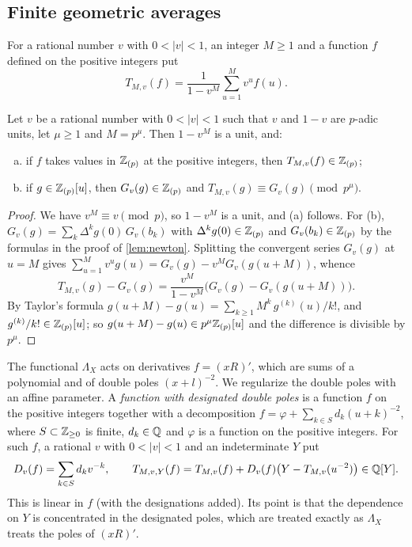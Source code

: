 \subsection{Finite geometric averages}\label{sec:finite-averages}
For a rational number $v$ with $0<|v|<1$, an integer $M\ge1$ and a function $f$ defined on the positive integers put
\[
T_{M,v}(f)=\frac1{1-v^M}\sum_{u=1}^Mv^uf(u).
\]

\begin{lemma}\label{lem:finite-moments}
Let $v$ be a rational number with $0<|v|<1$ such that $v$ and $1-v$ are $p$-adic units, let $\mu\ge1$ and $M=p^\mu$. Then $1-v^M$ is a unit, and:
\begin{enumerate}[(a)]
\item if $f$ takes values in $\mathbb{Z}_{(p)}$ at the positive integers, then $T_{M,v}(f)\in\mathbb{Z}_{(p)}$;
\item if $g\in\mathbb{Z}_{(p)}[u]$, then $G_v(g)\in\mathbb{Z}_{(p)}$ and $T_{M,v}(g)\equiv G_v(g)\pmod{p^\mu}$.
\end{enumerate}
\end{lemma}

\begin{proof}
We have $v^M\equiv v\pmod p$, so $1-v^M$ is a unit, and (a) follows. For (b), $G_v(g)=\sum_k\Delta^kg(0)\,G_v(b_k)$ with $\Delta^kg(0)\in\mathbb{Z}_{(p)}$ and $G_v(b_k)\in\mathbb{Z}_{(p)}$ by the formulas in the proof of \cref{lem:newton}. Splitting the convergent series $G_v(g)$ at $u=M$ gives $\sum_{u=1}^Mv^ug(u)=G_v(g)-v^MG_v(g(u+M))$, whence
\[
T_{M,v}(g)-G_v(g)=\frac{v^M}{1-v^M}\bigl(G_v(g)-G_v(g(u+M))\bigr).
\]
By Taylor's formula $g(u+M)-g(u)=\sum_{k\ge1}M^k\,g^{(k)}(u)/k!$, and $g^{(k)}/k!\in\mathbb{Z}_{(p)}[u]$; so $g(u+M)-g(u)\in p^\mu\mathbb{Z}_{(p)}[u]$ and the difference is divisible by $p^\mu$.
\end{proof}

The functional $\Lambda_X$ acts on derivatives $f=(xR)'$, which are sums of a polynomial and of double poles $(x+l)^{-2}$. We regularize the double poles with an affine parameter. A \emph{function with designated double poles} is a function $f$ on the positive integers together with a decomposition $f=\varphi+\sum_{k\in S}d_k(u+k)^{-2}$, where $S\subset\mathbb{Z}_{\ge0}$ is finite, $d_k\in\mathbb{Q}$ and $\varphi$ is a function on the positive integers. For such $f$, a rational $v$ with $0<|v|<1$ and an indeterminate $Y$ put
\[
D_v(f)=\sum_{k\in S}d_kv^{-k},\qquad T_{M,v,Y}(f)=T_{M,v}(f)+D_v(f)\bigl(Y-T_{M,v}(u^{-2})\bigr)\in\mathbb{Q}[Y].
\]
This is linear in $f$ (with the designations added). Its point is that the dependence on $Y$ is concentrated in the designated poles, which are treated exactly as $\Lambda_X$ treats the poles of $(xR)'$.

